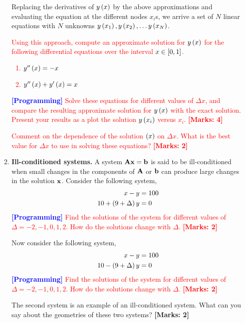 \documentclass[12pt]{article}
\def\mf{\ensuremath\mathbf}
\def\lp{\ensuremath\left(}
\def\rp{\ensuremath\right)}
\def\ls{\ensuremath\left[}
\def\rs{\ensuremath\right]}
\newcommand{\ct}[1]{\lp #1\rp}
\newcommand{\dt}[1]{\ls #1\rs}
\begin{document}
\begin{enumerate}
Replacing the derivatives of $y\ct{x}$ by the above approximations and evaluating the equation at the different nodes $x_i$s, we arrive a set of $N$ linear equations with $N$ unknowns $y\ct{x_1}, y\ct{x_2}, \ldots y\ct{x_N}$. 

\textcolor{red}{Using this approach, compute an approximate solution for $y\ct{x}$ for the following differential equations over the interval $x \in \dt{0, 1}$.
\begin{enumerate}
        \item $y''\ct{x} = -x$
        \item $y''\ct{x} + y'\ct{x} = x$
\end{enumerate}
\textcolor{blue}{\textbf{[Programming]}} Solve these equations for different values of $\Delta x$, and compare the resulting approximate solution for $y\ct{x}$ with the exact solution.   Present your results as a plot the solution $y\ct{x_i}$ versus $x_i$. \textbf{[Marks: 4]}}

\textcolor{red}{Comment on the dependence of the solution $\ct{x}$ on $\Delta x$. What is the best value for $\Delta x$ to use in solving these equations? \textbf{[Marks: 2]}}

\item \textbf{Ill-conditioned systems.} A system $\mf{A}\mf{x} = \mf{b}$ is said to be ill-conditioned when small changes in the components of $\mf{A}$ or $\mf{b}$ can produce large changes in the solution $\mf{x}$. Consider the following system,
\begin{align}
x - y &= 100 \nonumber \\
10 + \ct{9 + \Delta}y &= 0 \nonumber
\end{align}
\textcolor{red}{\textcolor{blue}{\textbf{[Programming]}} Find the solutions of the system for different values of $\Delta = -2, -1, 0, 1, 2$. How do the solutions change with $\Delta$. \textbf{[Marks: 2]}} 

Now consider the following system,
\begin{align}
x - y &= 100 \nonumber \\
10 - \ct{9 + \Delta}y &= 0 \nonumber
\end{align}
\textcolor{red}{\textcolor{blue}{\textbf{[Programming]}} Find the solutions of the system for different values of $\Delta = -2, -1, 0, 1, 2$. How do the solutions change with $\Delta$. \textbf{[Marks: 2]}} 

The second system is an example of an ill-conditioned system. What can you say about the geometries of these two systems? \textbf{[Marks: 2]}


\end{enumerate}
\end{document}
